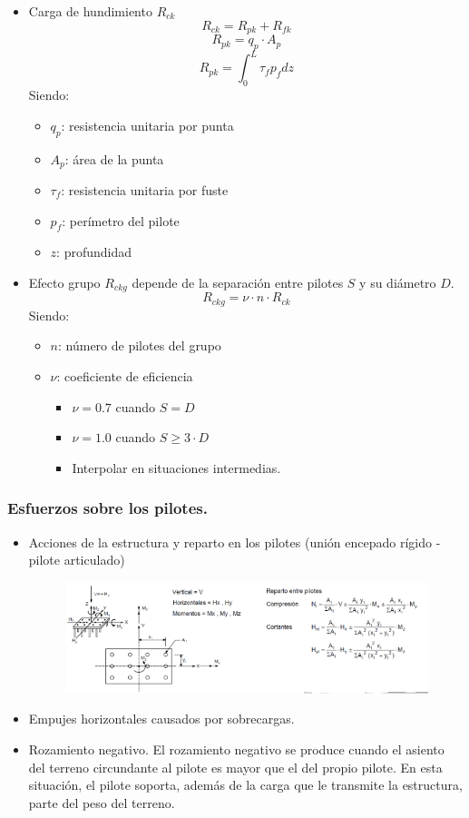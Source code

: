 \begin{itemize}
    \item Carga de hundimiento $R_{ck}$
    \[R_{ck} = R_{pk} + R_{fk}\]
    \[R_{pk} = q_p \cdot A_p\]
    \[R_{pk} = \int_0^L{\tau_f p_f dz}\]
    Siendo:
    \begin{itemize}
        \item $q_p$: resistencia unitaria por punta
        \item $A_p$: área de la punta
        \item $\tau_f$: resistencia unitaria por fuste
        \item $p_f$: perímetro del pilote
        \item $z$: profundidad
    \end{itemize}
    \item Efecto grupo $R_{ckg}$ depende de la separación entre pilotes $S$ y su diámetro $D$.
    \[R_{ckg} = \nu \cdot n \cdot R_{ck}\]
    Siendo:
    \begin{itemize}
        \item $n$: número de pilotes del grupo
        \item $\nu$: coeficiente de eficiencia
        \begin{itemize}
            \item $\nu = 0.7$ cuando $S=D$
            \item $\nu = 1.0$ cuando $S \geq 3 \cdot D$
            \item Interpolar en situaciones intermedias.
        \end{itemize}
    \end{itemize}
\end{itemize}

\subsubsection{Esfuerzos sobre los pilotes.}

\begin{itemize}
    \item Acciones de la estructura y reparto en los pilotes (unión encepado rígido - pilote articulado)
    \begin{figure}[H]
        \centering
        \includegraphics[width = 1 \linewidth]{Imagenes/Cimentaciones profundas - esfuerzos sobre pilotes.png}
    \end{figure}
    \item Empujes horizontales causados por sobrecargas.
    \item Rozamiento negativo. El rozamiento negativo se produce cuando el asiento del terreno circundante al pilote es mayor que el del propio pilote. En esta situación, el pilote soporta, además de la carga que le transmite la estructura, parte del peso del terreno.
\end{itemize}

